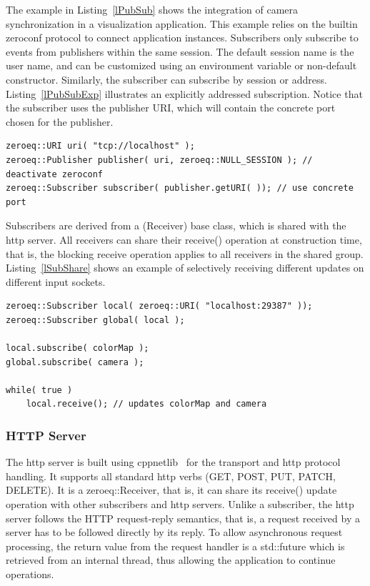 \documentclass[10pt]{llncs}
\newcommand{\lref}[1]{Listing~\ref{#1}}
\begin{document}
The example in \lref{lPubSub} shows the integration of camera
synchronization in a visualization application. This example relies on the
builtin zeroconf protocol to connect application instances. Subscribers only
subscribe to events from publishers within the same session. The default
session name is the user name, and can be customized using an environment
variable or non-default constructor. Similarly, the subscriber can subscribe by
session or address. \lref{lPubSubExp} illustrates an explicitly addressed
subscription. Notice that the subscriber uses the publisher URI, which will
contain the concrete port chosen for the publisher.

\begin{lstlisting}[float, caption=Explicit Addressing,label=lPubSubExp]
zeroeq::URI uri( "tcp://localhost" );
zeroeq::Publisher publisher( uri, zeroeq::NULL_SESSION ); // deactivate zeroconf
zeroeq::Subscriber subscriber( publisher.getURI( )); // use concrete port
\end{lstlisting}

Subscribers are derived from a \textsf(Receiver) base class, which is shared
with the http server. All receivers can share their \textsf{receive()}
operation at construction time, that is, the blocking receive operation applies
to all receivers in the shared group. \lref{lSubShare} shows an example of
selectively receiving different updates on different input sockets.

\begin{lstlisting}[float,caption=Subscriber Sharing, label=lSubShare]
zeroeq::Subscriber local( zeroeq::URI( "localhost:29387" ));
zeroeq::Subscriber global( local );

local.subscribe( colorMap );
global.subscribe( camera );

while( true )
    local.receive(); // updates colorMap and camera
\end{lstlisting}

\subsubsection{HTTP Server}

The http server is built using cppnetlib~\cite{cppnetlib} for the transport and
http protocol handling. It supports all standard http verbs (GET, POST, PUT,
PATCH, DELETE). It is a \textsf{zeroeq::Receiver}, that is, it can share its
\textsf{receive()} update operation with other subscribers and http servers.
Unlike a subscriber, the http server follows the HTTP request-reply semantics,
that is, a request received by a server has to be followed directly by its
reply. To allow asynchronous request processing, the return value from the
request handler is a \textsf{std::future} which is retrieved from an internal
thread, thus allowing the application to continue operations.
\end{document}
